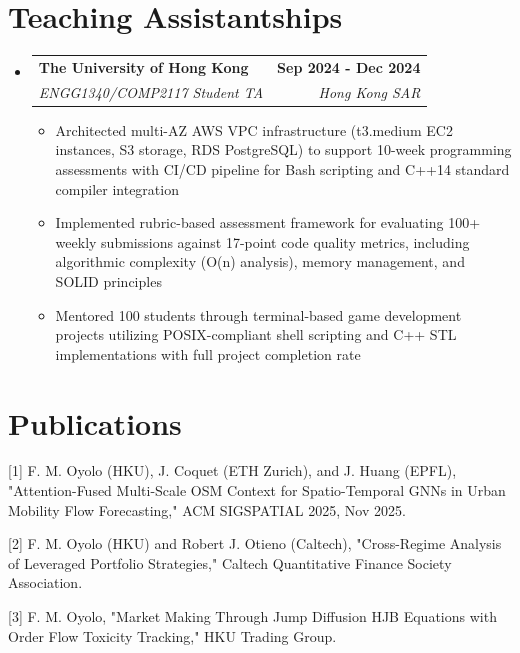 \documentclass[letterpaper,11pt]{article}
\makeatletter
\newcommand{\resumeItem}[1]{
  \item\small{
    {#1 \vspace{-2pt}}
  }
}
\newcommand{\resumeSubheading}[4]{
  \vspace{-2pt}\item
    \begin{tabular*}{1.0\textwidth}[t]{l@{\extracolsep{\fill}}r}
      \textbf{#1} & \textbf{\small #2} \\
      \textit{\small#3} & \textit{\small #4} \\
    \end{tabular*}\vspace{-7pt}
}
\newcommand{\resumeSubHeadingListStart}{\begin{itemize}[leftmargin=0.0in, label={}]}
\newcommand{\resumeSubHeadingListEnd}{\end{itemize}}
\newcommand{\resumeItemListStart}{\begin{itemize}}
\newcommand{\resumeItemListEnd}{\end{itemize}\vspace{-5pt}}
\makeatother
\begin{document}
    
\section{Teaching Assistantships}
  \resumeSubHeadingListStart
    \resumeSubheading
      {The University of Hong Kong}{Sep 2024 -  Dec 2024}
      {ENGG1340/COMP2117 Student TA}{Hong Kong SAR}
      \resumeItemListStart
      \vspace{3pt} %
        \resumeItem{Architected multi-AZ AWS VPC infrastructure (t3.medium EC2 instances, S3 storage, RDS PostgreSQL) to support 10-week programming assessments with CI/CD pipeline for Bash scripting and C++14 standard compiler integration}
        \resumeItem{Implemented rubric-based assessment framework for evaluating 100+ weekly submissions against 17-point code quality metrics, including algorithmic complexity (O(n) analysis), memory management, and SOLID principles}
        \resumeItem{Mentored 100 students through terminal-based game development projects utilizing POSIX-compliant shell scripting and C++ STL implementations with full project completion rate}
      \resumeItemListEnd
  \resumeSubHeadingListEnd





\section{Publications}
 \begin{itemize}[leftmargin=0.15in, label={}]
    \small{\item{
    [1] F. M. Oyolo (HKU), J. Coquet (ETH Zurich), and J. Huang (EPFL), "Attention-Fused Multi-Scale OSM Context for Spatio-Temporal GNNs in Urban Mobility Flow Forecasting," ACM SIGSPATIAL 2025, Nov 2025.}}
    \vspace{-5pt}
    \small{\item{
    [2] F. M. Oyolo (HKU) and Robert J. Otieno (Caltech), "Cross-Regime Analysis of Leveraged Portfolio Strategies," Caltech Quantitative Finance Society Association. \href{https://drive.google.com/...}{\faLink}}}
    \vspace{-5pt}
    \small{\item{
    [3] F. M. Oyolo, "Market Making Through Jump Diffusion HJB Equations with Order Flow Toxicity Tracking," HKU Trading Group. \href{https://shorturl.at/Dqnsw}{\faLink}}}
 \end{itemize}
\end{document}
